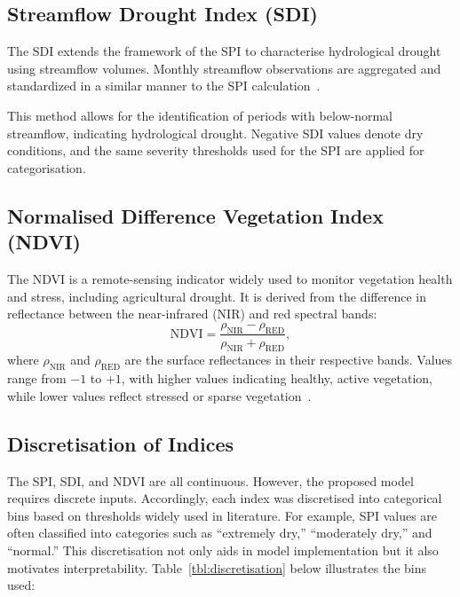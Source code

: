 \subsection{Streamflow Drought Index (SDI)}

The SDI extends the framework of the SPI to characterise hydrological drought using streamflow volumes. Monthly streamflow observations are aggregated and standardized in a similar manner to the SPI calculation~\cite{sdi_seminal_paper}.

This method allows for the identification of periods with below-normal streamflow, indicating hydrological drought. Negative SDI values denote dry conditions, and the same severity thresholds used for the SPI are applied for categorisation.

\subsection{Normalised Difference Vegetation Index (NDVI)}

The NDVI is a remote-sensing indicator widely used to monitor vegetation health and stress, including agricultural drought. It is derived from the difference in reflectance between the near-infrared (NIR) and red spectral bands:
\[
    \text{NDVI} = \frac{\rho_{\text{NIR}} - \rho_{\text{RED}}}{\rho_{\text{NIR}} + \rho_{\text{RED}}},
\]
where $\rho_{\text{NIR}}$ and $\rho_{\text{RED}}$ are the surface reflectances in their respective bands. Values range from $-1$ to $+1$, with higher values indicating healthy, active vegetation, while lower values reflect stressed or sparse vegetation~\cite{ndvi_seminal_paper}.

\subsection{Discretisation of Indices}
The SPI, SDI, and NDVI are all continuous. However, the proposed model requires discrete inputs. Accordingly, each index was discretised into categorical bins based on thresholds widely used in literature. For example, SPI values are often classified into categories such as “extremely dry,” “moderately dry,” and “normal.” This discretisation not only aids in model implementation but it also motivates interpretability. Table~\ref{tbl:discretisation} below illustrates the bins used:

